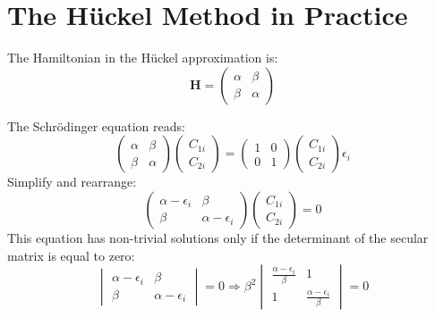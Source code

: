 \documentclass[../Main/chem532-notes.tex]{subfiles}
\begin{document}
\section{The H\"{u}ckel Method in Practice}
\begin{example}[Ethylene]

The Hamiltonian in the H\"{u}ckel approximation is:
\begin{equation}
\mathbf{H} = \begin{pmatrix}
\alpha & \beta \\
\beta & \alpha
\end{pmatrix}
\end{equation}

The Schr\"{o}dinger equation reads:
\begin{equation}
\begin{pmatrix}
\alpha & \beta \\
\beta & \alpha
\end{pmatrix}
\begin{pmatrix}
C_{1i}\\
C_{2i}
\end{pmatrix}
=
\begin{pmatrix}
1 & 0 \\
0 & 1
\end{pmatrix}
\begin{pmatrix}
C_{1i}\\
C_{2i}
\end{pmatrix}
\epsilon_i
\end{equation}
Simplify and rearrange:
\begin{equation}
\begin{pmatrix}
\alpha - \epsilon_i & \beta \\
\beta & \alpha - \epsilon_i
\end{pmatrix}
\begin{pmatrix}
C_{1i}\\
C_{2i}
\end{pmatrix}
= 0
\end{equation}
This equation has non-trivial solutions
only if the determinant of the secular matrix is equal to zero:
\begin{equation}
\begin{vmatrix}
\alpha - \epsilon_i & \beta \\
\beta & \alpha - \epsilon_i
\end{vmatrix}
= 0
\Rightarrow
\beta^2 \begin{vmatrix}
\frac{\alpha - \epsilon_i}{\beta} & 1 \\
1 & \frac{\alpha - \epsilon_i}{\beta}
\end{vmatrix}
= 0
\end{equation}


\end{example}
\end{document}
